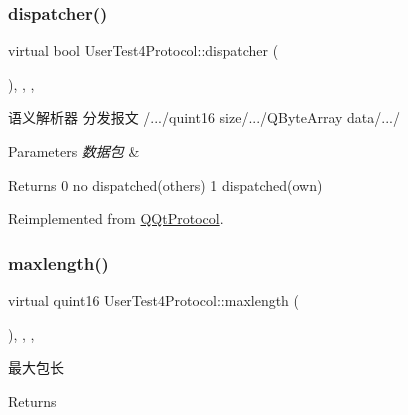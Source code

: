\subsubsection{\texorpdfstring{dispatcher()}{dispatcher()}}
{\footnotesize\ttfamily virtual bool User\+Test4\+Protocol\+::dispatcher (\begin{DoxyParamCaption}\item[{const Q\+Byte\+Array \&}]{ }\end{DoxyParamCaption})\hspace{0.3cm}{\ttfamily [inline]}, {\ttfamily [override]}, {\ttfamily [protected]}, {\ttfamily [virtual]}}



语义解析器 分发报文 /.../quint16 size/.../\+Q\+Byte\+Array data/.../ 


\begin{DoxyParams}{Parameters}
{\em 数据包} & \\
\hline
\end{DoxyParams}
\begin{DoxyReturn}{Returns}
0 no dispatched(others) 1 dispatched(own) 
\end{DoxyReturn}


Reimplemented from \mbox{\hyperlink{class_q_qt_protocol_a35a69c4b89c8cf7459038f40d75e0dc9}{Q\+Qt\+Protocol}}.

\mbox{\label{class_user_test4_protocol_ad85ffaadace1a7ed1847796724cb27e6}} 
\subsubsection{\texorpdfstring{maxlength()}{maxlength()}}
{\footnotesize\ttfamily virtual quint16 User\+Test4\+Protocol\+::maxlength (\begin{DoxyParamCaption}{ }\end{DoxyParamCaption})\hspace{0.3cm}{\ttfamily [inline]}, {\ttfamily [override]}, {\ttfamily [protected]}, {\ttfamily [virtual]}}



最大包长 

\begin{DoxyReturn}{Returns}

\end{DoxyReturn}


